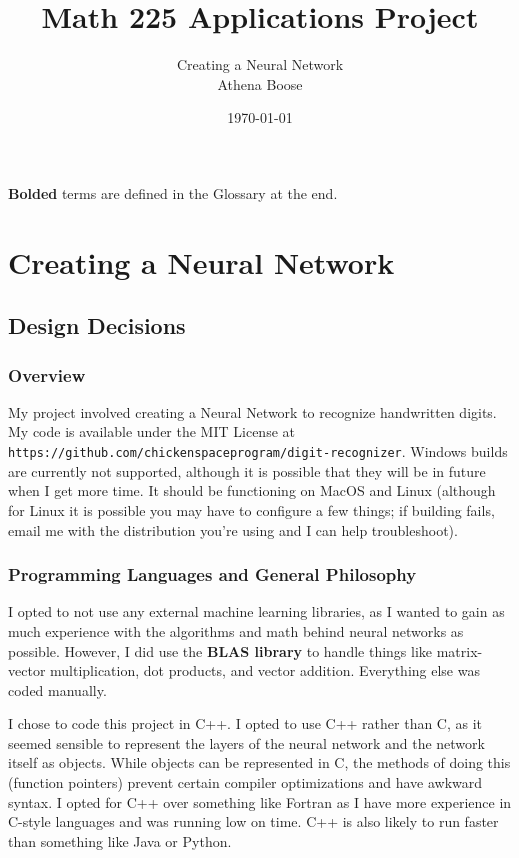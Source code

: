 \documentclass[12pt]{article}
\author{Creating a Neural Network\bigskip\\Athena Boose}
\title{Math 225 Applications Project}
\date{\today}
\begin{document}
\maketitle

\textbf{Bolded} terms are defined in the Glossary at the end.

\section{Creating a Neural Network}

\subsection{Design Decisions}

\subsubsection{Overview}

My project involved creating a Neural Network to recognize handwritten digits.
My code is available under the MIT License at \verb|https://github.com/chickenspaceprogram/digit-recognizer|.
Windows builds are currently not supported, although it is possible that they will be in future when I get more time.
It should be functioning on MacOS and Linux (although for Linux it is possible you may have to configure a few things; if building fails, email me with the distribution you're using and I can help troubleshoot).

\subsubsection{Programming Languages and General Philosophy}

I opted to not use any external machine learning libraries, as I wanted to gain as much experience with the algorithms and math behind neural networks as possible.
However, I did use the \textbf{BLAS library} to handle things like matrix-vector multiplication, dot products, and vector addition.
Everything else was coded manually.

I chose to code this project in C++.
I opted to use C++ rather than C, as it seemed sensible to represent the layers of the neural network and the network itself as objects.
While objects can be represented in C, the methods of doing this (function pointers) prevent certain compiler optimizations and have awkward syntax.
I opted for C++ over something like Fortran as I have more experience in C-style languages and was running low on time.
C++ is also likely to run faster than something like Java or Python.
\end{document}
